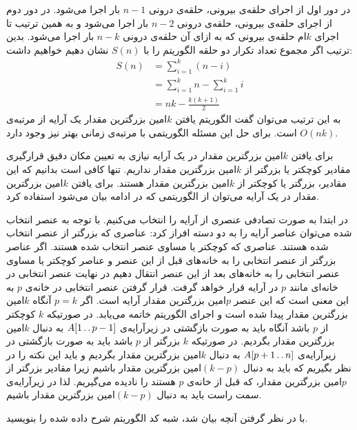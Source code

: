 در دور اول از اجرای حلقه‌ی بیرونی، حلقه‌ی درونی {$n-1$} بار اجرا می‌شود. در دور دوم از اجرای حلقه‌ی بیرونی، حلقه‌ی درونی {$n-2$} بار اجرا می‌شود و به همین ترتیب تا اجرای {$k$}ام حلقه‌ی بیرونی که به ازای آن حلقه‌ی درونی {$n-k$} بار اجرا می‌شود. بدین ترتیب اگر مجموع تعداد تکرار دو حلقه الگوریتم {} را با {$S(n)$} نشان دهیم خواهیم داشت:
\begin{align*}
S(n)&=\sum_{i=1}^{k}{(n-i)}\\
	&=\sum_{i=1}^{k}{n} - \sum_{i=1}^{k}{i}\\
	&=nk-\frac{k(k+1)}{2}
\end{align*}
به این ترتیب می‌توان گفت الگوریتم یافتن {$k$}امین بزرگترین مقدار یک آرایه از مرتبه‌ی {$O(nk)$} است. برای حل این مسئله الگوریتمی با مرتبه‌ی زمانی بهتر نیز وجود دارد.

 برای یافتن {$k$}امین بزرگترین مقدار در یک آرایه نیازی به تعیین مکان دقیق قرارگیری مقادیر کوچکتر یا بزرگتر از {$k$}امین بزرگترین مقدار   نداریم. تنها کافی است بدانیم که این مقادیر، بزرگتر یا کوچکتر از {$k$}امین بزرگترین مقدار هستند. برای یافتن {$k$}امین بزرگترین مقدار در یک آرایه می‌توان از الگوریتمی که در ادامه بیان می‌شود استفاده کرد.

در ابتدا به صورت تصادفی عنصری از آرایه را انتخاب می‌کنیم. با توجه به عنصر انتخاب شده می‌توان عناصر آرایه را به دو دسته افراز کرد:
 عناصری که بزرگتر از عنصر انتخاب‌ شده هستند.
 عناصری که کوچکتر یا مساوی عنصر انتخاب شده هستند.
اگر عناصر بزرگتر از عنصر انتخابی را به خانه‌‌های قبل از این عنصر و عناصر کوچکتر یا مساوی عنصر انتخابی را به خانه‌های بعد از این عنصر انتقال دهیم در نهایت عنصر انتخابی در خانه‌ای مانند {$p$} در آرایه قرار خواهد گرفت. قرار گرفتن عنصر انتخابی در خانه‌ی {$p$} به این معنی‌ است که این عنصر {$p$}امین بزرگترین مقدار آرایه است. اگر {$p=k$} آنگاه {$k$}امین بزرگترین مقدار پیدا شده است و اجرای الگوریتم خاتمه می‌یابد. در صورتیکه {$k$} کوچکتر از {$p$} باشد آنگاه باید به صورت بازگشتی در زیرآرایه‌ی {$A[1\mathinner{\ldotp\ldotp} p-1]$} به دنبال {$k$}امین بزرگترین مقدار بگردیم. در صورتیکه {$k$} بزرگتر از {$p$} باشد باید به صورت بازگشتی در زیرآرایه‌ی {$A[p+1\mathinner{\ldotp\ldotp} n]$} به دنبال {$k$}امین بزرگترین مقدار بگردیم و باید این نکته را در نظر بگیریم که باید به دنبال {$(k-p)$}امین بزرگترین مقدار باشیم زیرا مقادیر بزرگتر از {$p$}امین بزرگترین مقدار، که قبل از خانه‌ی {$p$} هستند را نادیده می‌گیریم. لذا در زیرآرایه‌ی سمت راست باید به دنبال {$(k-p)$}امین بزرگترین مقدار باشیم.

با در نظر گرفتن آنچه بیان شد، شبه کد الگوریتم شرح داده شده را بنویسید.

